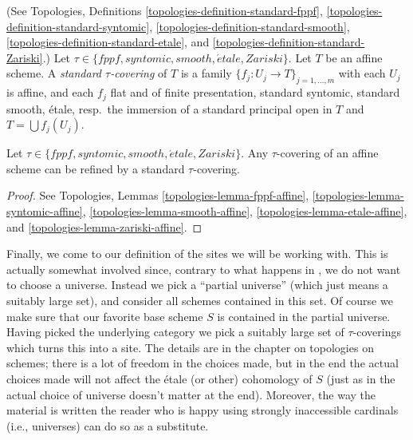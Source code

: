 \begin{definition}
\label{definition-standard-tau}
(See
Topologies, Definitions
\ref{topologies-definition-standard-fppf},
\ref{topologies-definition-standard-syntomic},
\ref{topologies-definition-standard-smooth},
\ref{topologies-definition-standard-etale}, and
\ref{topologies-definition-standard-Zariski}.)
Let $\tau \in \{fppf, syntomic, smooth, \acute{e}tale, Zariski\}$.
Let $T$ be an affine scheme.
A {\it standard $\tau$-covering} of $T$ is a family
$\{f_j : U_j \to T\}_{j = 1, \ldots, m}$ with each $U_j$ is affine,
and each $f_j$ flat and of finite presentation,
standard syntomic, standard smooth, \'etale, resp.\ the immersion of a
standard principal open in $T$ and $T = \bigcup f_j(U_j)$.
\end{definition}

\begin{lemma}
\label{lemma-tau-affine}
Let $\tau \in \{fppf, syntomic, smooth, \acute{e}tale, Zariski\}$.
Any $\tau$-covering of an affine scheme can be refined by a
standard $\tau$-covering.
\end{lemma}

\begin{proof}
See
Topologies, Lemmas
\ref{topologies-lemma-fppf-affine},
\ref{topologies-lemma-syntomic-affine},
\ref{topologies-lemma-smooth-affine},
\ref{topologies-lemma-etale-affine}, and
\ref{topologies-lemma-zariski-affine}.
\end{proof}

\noindent
Finally, we come to our definition of the sites we will be working with.
This is actually somewhat involved since, contrary to what happens in
\cite{SGA4}, we do not want to choose a universe. Instead we pick a ``partial
universe'' (which just means a suitably large set), and consider all schemes
contained in this set. Of course we make sure that our favorite base scheme
$S$ is contained in the partial universe. Having picked the underlying category
we pick a suitably large set of $\tau$-coverings which turns this into a site.
The details are in the chapter on topologies on schemes; there is a lot of
freedom in the choices made, but in the end the actual choices made will not
affect the \'etale (or other) cohomology of $S$ (just as in \cite{SGA4} the
actual choice of universe doesn't matter at the end). Moreover, the way the
material is written the reader who is happy using strongly inaccessible
cardinals (i.e., universes) can do so as a substitute.

